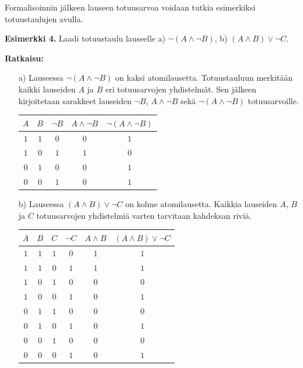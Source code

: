 Formalisoinnin jälkeen lauseen totuusarvoa voidaan tutkia esimerkiksi totuustaulujen avulla.

{\bf Esimerkki 4.}
Laadi totuustaulu lauseelle a) $\lnot(A\land \lnot B)$, b) $(A\land B)\lor \lnot C$.

{\bf Ratkaisu:}
\begin{itemize}
\item[a)] Lauseessa $\lnot(A\land \lnot B)$ on kaksi atomilausetta. Totuustauluun merkitään kaikki lauseiden $A$ ja $B$ eri totuusarvojen yhdistelmät. Sen jälkeen kirjoitetaan sarakkeet lauseiden $\lnot B$, $A\land \lnot B$ sekä $\lnot(A\land \lnot B)$  totuusarvoille.
\bigskip

\begin{center}
\begin{tabular}{|c|c|c|c|c|}\hline
$A$ & $B$ & $\lnot B$ & $A\land \lnot B$ & $\lnot(A\land \lnot B)$ \\ \hline
$1$ & $1$ & $0$       & $0$ & $1$ \\ 
$1$ & $0$ & $1$       & $1$ & $0$ \\
$0$ & $1$ & $0$       & $0$ & $1$ \\
$0$ & $0$ & $1$       & $0$ & $1$ \\ \hline
\end{tabular}
\end{center}

\bigskip

\item[b)] Lauseessa $(A\land B)\lor \lnot C$ on kolme atomilausetta. Kaikkia lauseiden $A$, $B$ ja $C$ totuusarvojen yhdistelmiä varten tarvitaan kahdeksan riviä.

\bigskip

\begin{center}
\begin{tabular}{|c|c|c|c|c|c|}\hline
$A$ & $B$ & $C$ & $\lnot C$ & $A\land B$ & $(A\land B)\lor \lnot C$\\ \hline
$1$ & $1$ & $1$ & $0$ & $1$ & $1$ \\ %
$1$ & $1$ & $0$ & $1$ & $1$ & $1$ \\
$1$ & $0$ & $1$ & $0$ & $0$ & $0$ \\
$1$ & $0$ & $0$ & $1$ & $0$ & $1$ \\
$0$ & $1$ & $1$ & $0$ & $0$ & $0$ \\
$0$ & $1$ & $0$ & $1$ & $0$ & $1$ \\
$0$ & $0$ & $1$ & $0$ & $0$ & $0$ \\
$0$ & $0$ & $0$ & $1$ & $0$ & $1$ \\ \hline
\end{tabular}
\end{center}

\end{itemize}


